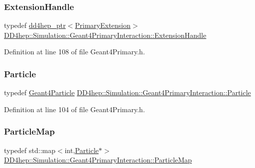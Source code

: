 \subsubsection{\texorpdfstring{Extension\+Handle}{ExtensionHandle}}
{\footnotesize\ttfamily typedef \hyperlink{class_d_d4hep_1_1dd4hep__ptr}{dd4hep\+\_\+ptr}$<$\hyperlink{class_d_d4hep_1_1_simulation_1_1_primary_extension}{Primary\+Extension}$>$ \hyperlink{class_d_d4hep_1_1_simulation_1_1_geant4_primary_interaction_a9d53c6c8fa2e7a6094ba91854af945f4}{D\+D4hep\+::\+Simulation\+::\+Geant4\+Primary\+Interaction\+::\+Extension\+Handle}}



Definition at line 108 of file Geant4\+Primary.\+h.

\hypertarget{class_d_d4hep_1_1_simulation_1_1_geant4_primary_interaction_a5b651f0c428d71ffdac8cb38bc6f3513}{}\label{class_d_d4hep_1_1_simulation_1_1_geant4_primary_interaction_a5b651f0c428d71ffdac8cb38bc6f3513} 
\subsubsection{\texorpdfstring{Particle}{Particle}}
{\footnotesize\ttfamily typedef \hyperlink{class_d_d4hep_1_1_simulation_1_1_geant4_particle}{Geant4\+Particle} \hyperlink{class_d_d4hep_1_1_simulation_1_1_geant4_primary_interaction_a5b651f0c428d71ffdac8cb38bc6f3513}{D\+D4hep\+::\+Simulation\+::\+Geant4\+Primary\+Interaction\+::\+Particle}}



Definition at line 104 of file Geant4\+Primary.\+h.

\hypertarget{class_d_d4hep_1_1_simulation_1_1_geant4_primary_interaction_a6787a2c42dc1fd371b274e75dc380e92}{}\label{class_d_d4hep_1_1_simulation_1_1_geant4_primary_interaction_a6787a2c42dc1fd371b274e75dc380e92} 
\subsubsection{\texorpdfstring{Particle\+Map}{ParticleMap}}
{\footnotesize\ttfamily typedef std\+::map$<$int,\hyperlink{class_d_d4hep_1_1_simulation_1_1_geant4_primary_interaction_a5b651f0c428d71ffdac8cb38bc6f3513}{Particle}$\ast$$>$ \hyperlink{class_d_d4hep_1_1_simulation_1_1_geant4_primary_interaction_a6787a2c42dc1fd371b274e75dc380e92}{D\+D4hep\+::\+Simulation\+::\+Geant4\+Primary\+Interaction\+::\+Particle\+Map}}



